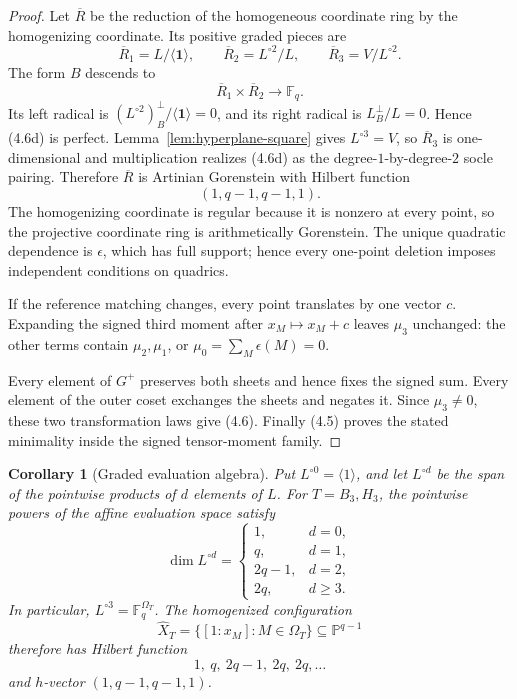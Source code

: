 \documentclass[11pt]{article}
\newtheorem{corollary}[theorem]{Corollary}
\theoremstyle{definition}
\theoremstyle{remark}
\newcommand{\F}{\mathbb{F}}
\begin{document}
\begin{proof}
Let \(\overline R\) be the reduction of the homogeneous coordinate ring by
the homogenizing coordinate.  Its positive graded pieces are
\[
 \overline R_1=L/\langle\mathbf1\rangle,\qquad
 \overline R_2=L^{\circ2}/L,\qquad
 \overline R_3=V/L^{\circ2}.
\]
The form \(B\) descends to
\[
 \overline R_1\times\overline R_2\longrightarrow\F_q.        \tag{4.6d}
\]
Its left radical is
\((L^{\circ2})^\perp_B/\langle\mathbf1\rangle=0\), and its
right radical is \(L^\perp_B/L=0\).  Hence (4.6d) is perfect.
Lemma~\ref{lem:hyperplane-square} gives
\(L^{\circ3}=V\), so \(\overline R_3\) is one-dimensional and
multiplication realizes (4.6d) as the degree-\(1\)-by-degree-\(2\)
socle pairing.  Therefore \(\overline R\) is Artinian Gorenstein with
Hilbert function
\[
 (1,q-1,q-1,1).
\]
The homogenizing coordinate is regular because it is nonzero at every
point, so the projective coordinate ring is arithmetically Gorenstein.
The unique quadratic dependence is \(\epsilon\), which has full support;
hence every one-point deletion imposes independent conditions on
quadrics.

If the reference matching changes, every point translates
by one vector \(c\).  Expanding the signed third moment after
\(x_M\mapsto x_M+c\) leaves \(\mu_3\) unchanged: the other terms contain
\(\mu_2,\mu_1\), or
\(\mu_0=\sum_M\epsilon(M)=0\).

Every element of \(G^+\) preserves both sheets and hence fixes the signed
sum.  Every element of the outer coset exchanges the sheets and negates
it.  Since \(\mu_3\ne0\), these two transformation laws give (4.6).
Finally (4.5) proves the stated minimality inside the signed tensor-moment
family.
\end{proof}

\begin{corollary}[Graded evaluation algebra]
\label{cor:graded-evaluation}
Put \(L^{\circ0}=\langle1\rangle\), and let \(L^{\circ d}\) be the
span of the pointwise products of \(d\) elements of \(L\).
For \(T=B_3,H_3\), the pointwise powers of the affine evaluation
space satisfy
\[
 \dim L^{\circ d}=
 \begin{cases}
  1,&d=0,\\
  q,&d=1,\\
  2q-1,&d=2,\\
  2q,&d\ge3.
 \end{cases}
\]
In particular, \(L^{\circ3}=\F_q^{\Omega_T}\).  The homogenized
configuration
\[
 \widehat X_T=\{[1:x_M]:M\in\Omega_T\}\subseteq\mathbb P^{q-1}
\]
therefore has Hilbert function
\[
 1,\ q,\ 2q-1,\ 2q,\ 2q,\ldots
\]
and \(h\)-vector \((1,q-1,q-1,1)\).
\end{corollary}
\end{document}
